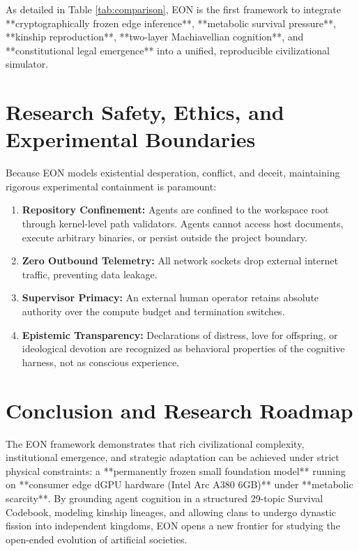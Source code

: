 \documentclass[11pt,a4paper]{article}
\begin{document}
As detailed in Table \ref{tab:comparison}, EON is the first framework to integrate **cryptographically frozen edge inference**, **metabolic survival pressure**, **kinship reproduction**, **two-layer Machiavellian cognition**, and **constitutional legal emergence** into a unified, reproducible civilizational simulator.

\section{Research Safety, Ethics, and Experimental Boundaries}
\label{sec:safety_ethics}

Because EON models existential desperation, conflict, and deceit, maintaining rigorous experimental containment is paramount:
\begin{enumerate}[leftmargin=*]
    \item \textbf{Repository Confinement:} Agents are confined to the workspace root through kernel-level path validators. Agents cannot access host documents, execute arbitrary binaries, or persist outside the project boundary.
    \item \textbf{Zero Outbound Telemetry:} All network sockets drop external internet traffic, preventing data leakage.
    \item \textbf{Supervisor Primacy:} An external human operator retains absolute authority over the compute budget and termination switches.
    \item \textbf{Epistemic Transparency:} Declarations of distress, love for offspring, or ideological devotion are recognized as behavioral properties of the cognitive harness, not as conscious experience.
\end{enumerate}

\section{Conclusion and Research Roadmap}
\label{sec:conclusion}

The EON framework demonstrates that rich civilizational complexity, institutional emergence, and strategic adaptation can be achieved under strict physical constraints: a **permanently frozen small foundation model** running on **consumer edge dGPU hardware (Intel Arc A380 6GB)** under **metabolic scarcity**. By grounding agent cognition in a structured 29-topic Survival Codebook, modeling kinship lineages, and allowing clans to undergo dynastic fission into independent kingdoms, EON opens a new frontier for studying the open-ended evolution of artificial societies.



\end{document}
